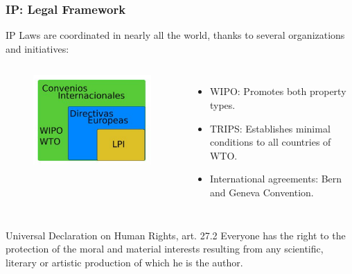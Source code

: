 \begin{frame}
\frametitle{IP: Legal Framework}

IP Laws are coordinated in nearly all the world, thanks to several
organizations and initiatives:

\begin{columns}

\column[t]{2.5cm}

\begin{figure}
\vspace{-0.6cm}
\begin{flushleft}
	\includegraphics[scale=0.3,clip=true]{figs/legal_framework.png}
\end{flushleft}
\end{figure}


\column[t]{8cm}

\begin{itemize}
\item WIPO: Promotes both property types.
\item TRIPS: Establishes minimal conditions to all countries of WTO.
\item International agreements: Bern and Geneva Convention. 
\end{itemize}

\end{columns}

\small
\begin{block}{Universal Declaration on Human Rights, art. 27.2}
Everyone has the right to the protection of the moral and material interests resulting from any scientific, literary or artistic production of which he is the author.
\end{block}


\end{frame}



